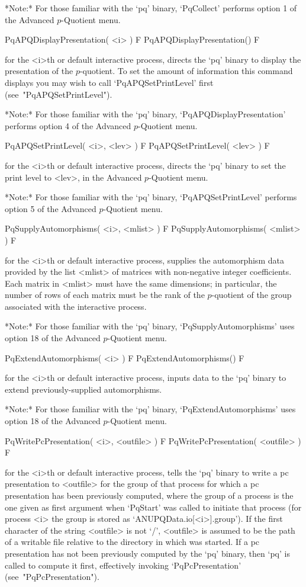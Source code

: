 *Note:* For those familiar with the  `pq'  binary,  `PqCollect'  performs
option 1 of the Advanced $p$-Quotient menu.

\>PqAPQDisplayPresentation( <i> ) F
\>PqAPQDisplayPresentation() F

for the <i>th or default interactive {\ANUPQ} process, directs  the  `pq'
binary to display the presentation of the $p$-quotient. To set the amount
of  information  this   command   displays   you   may   wish   to   call
`PqAPQSetPrintLevel' first (see~"PqAPQSetPrintLevel").

*Note:*
For those  familiar  with  the  `pq'  binary,  `PqAPQDisplayPresentation'
performs option 4 of the Advanced $p$-Quotient menu.

\>PqAPQSetPrintLevel( <i>, <lev> ) F
\>PqAPQSetPrintLevel( <lev> ) F

for the <i>th or default interactive {\ANUPQ} process, directs  the  `pq'
binary to set the print level to  <lev>,  in  the  Advanced  $p$-Quotient
menu.

*Note:* For those familiar with  the  `pq'  binary,  `PqAPQSetPrintLevel'
performs option 5 of the Advanced $p$-Quotient menu.

\>PqSupplyAutomorphisms( <i>, <mlist> ) F
\>PqSupplyAutomorphisms( <mlist> ) F

for the <i>th or  default  interactive  {\ANUPQ}  process,  supplies  the
automorphism  data  provided  by  the  list  <mlist>  of  matrices   with
non-negative integer coefficients. Each matrix in <mlist> must  have  the
same dimensions; in particular, the number of rows of each matrix must be
the rank of the $p$-quotient of the group associated with the interactive
{\ANUPQ} process.

*Note:* 
For those familiar with the  `pq'  binary,  `PqSupplyAutomorphisms'  uses
option 18 of the Advanced $p$-Quotient menu.

\>PqExtendAutomorphisms( <i> ) F
\>PqExtendAutomorphisms() F

for the <i>th or default interactive {\ANUPQ} process, inputs data to the
`pq' binary to extend previously-supplied automorphisms.

*Note:*
For those familiar with the  `pq'  binary,  `PqExtendAutomorphisms'  uses
option 18 of the Advanced $p$-Quotient menu.

\>PqWritePcPresentation( <i>, <outfile> ) F
\>PqWritePcPresentation( <outfile> ) F

for the <i>th or default interactive {\ANUPQ}  process,  tells  the  `pq'
binary to write a pc presentation to <outfile>  for  the  group  of  that
process for which a pc presentation has been previously  computed,  where
the group of a process is the one given as first argument when  `PqStart'
was called to initiate that process (for process <i> the group is  stored
as `ANUPQData.io[<i>].group'). If  the  first  character  of  the  string
<outfile> is not `/', <outfile> is assumed to be the path of  a  writable
file relative to the directory in which  {\GAP}  was  started.  If  a  pc
presentation has not been previously computed by the  `pq'  binary,  then
`pq'   is   called   to   compute   it   first,   effectively    invoking
`PqPcPresentation' (see~"PqPcPresentation").

